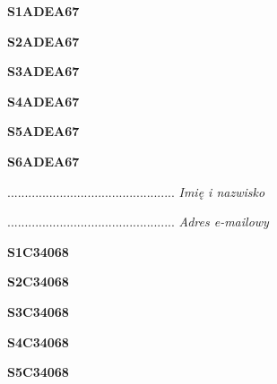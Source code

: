 \begin{turn}{90}\huge \textbf{S1ADEA67}\end{turn}

\begin{turn}{90}\huge \textbf{S2ADEA67}\end{turn}

\begin{turn}{90}\huge \textbf{S3ADEA67}\end{turn}

\begin{turn}{90}\huge \textbf{S4ADEA67}\end{turn}

\begin{turn}{90}\huge \textbf{S5ADEA67}\end{turn}

\begin{turn}{90}\huge \textbf{S6ADEA67}\end{turn}

\begin{turn}{90}\begin{minipage}{\linewidth} \vspace{20mm} ................................................  \textit{Imię i nazwisko}\end{minipage}\end{turn}

\begin{turn}{90}\begin{minipage}{\linewidth} \vspace{20mm} ................................................  \textit{Adres e-mailowy}\end{minipage}\end{turn}

\begin{turn}{90}\huge \textbf{S1C34068}\end{turn}

\begin{turn}{90}\huge \textbf{S2C34068}\end{turn}

\begin{turn}{90}\huge \textbf{S3C34068}\end{turn}

\begin{turn}{90}\huge \textbf{S4C34068}\end{turn}

\begin{turn}{90}\huge \textbf{S5C34068}\end{turn}

